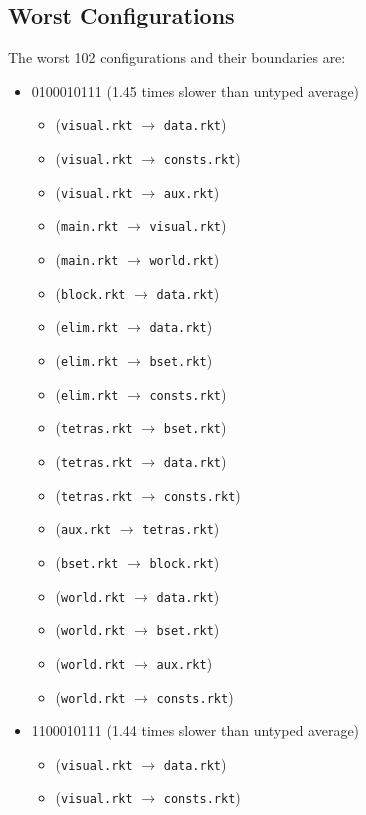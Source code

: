 \documentclass{article}
\newcommand{\mono}[1]{\texttt{#1}}
\begin{document}
\subsection{Worst Configurations}
The worst 102 configurations and their boundaries are:
\begin{itemize}
\item 0100010111 (1.45 times slower than untyped average)
  \begin{itemize}
  \item (\mono{visual.rkt} $\rightarrow$ \mono{data.rkt})
  \item (\mono{visual.rkt} $\rightarrow$ \mono{consts.rkt})
  \item (\mono{visual.rkt} $\rightarrow$ \mono{aux.rkt})
  \item (\mono{main.rkt} $\rightarrow$ \mono{visual.rkt})
  \item (\mono{main.rkt} $\rightarrow$ \mono{world.rkt})
  \item (\mono{block.rkt} $\rightarrow$ \mono{data.rkt})
  \item (\mono{elim.rkt} $\rightarrow$ \mono{data.rkt})
  \item (\mono{elim.rkt} $\rightarrow$ \mono{bset.rkt})
  \item (\mono{elim.rkt} $\rightarrow$ \mono{consts.rkt})
  \item (\mono{tetras.rkt} $\rightarrow$ \mono{bset.rkt})
  \item (\mono{tetras.rkt} $\rightarrow$ \mono{data.rkt})
  \item (\mono{tetras.rkt} $\rightarrow$ \mono{consts.rkt})
  \item (\mono{aux.rkt} $\rightarrow$ \mono{tetras.rkt})
  \item (\mono{bset.rkt} $\rightarrow$ \mono{block.rkt})
  \item (\mono{world.rkt} $\rightarrow$ \mono{data.rkt})
  \item (\mono{world.rkt} $\rightarrow$ \mono{bset.rkt})
  \item (\mono{world.rkt} $\rightarrow$ \mono{aux.rkt})
  \item (\mono{world.rkt} $\rightarrow$ \mono{consts.rkt})
  \end{itemize}
\item 1100010111 (1.44 times slower than untyped average)
  \begin{itemize}
  \item (\mono{visual.rkt} $\rightarrow$ \mono{data.rkt})
  \item (\mono{visual.rkt} $\rightarrow$ \mono{consts.rkt})

\end{itemize}
\end{itemize}
\end{document}
